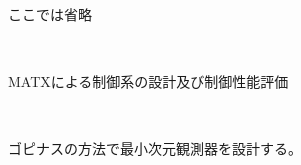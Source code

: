 \documentclass{jarticle}
\begin{document}
\begin{enumerate}
\begin{enumerate}
\begin{enumerate}
\begin{enumerate}
						ここでは省略\\
					  
				\end{enumerate}
			\end{enumerate}
		\end{enumerate}
		{\LARGE\item {}}\\
		\begin{enumerate}
			{\Large\item MATXによる制御系の設計及び制御性能評価}\\
			\begin{enumerate}
				{\large\item ゴピナスの方法で最小次元観測器を設計する。}\\
				

\end{enumerate}
\end{enumerate}
\end{enumerate}
\end{document}
